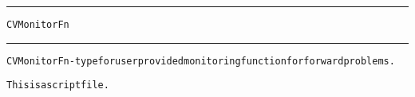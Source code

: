 \begin{samepage}
\hrule
\begin{center}
{\large \verb!CVMonitorFn!}
\label{p:CVMonitorFn}
\end{center}
\hrule\vspace{0.1in}



\begin{alltt}
CVMonitorFn - type for user provided monitoring function for forward problems.
\end{alltt}

\end{samepage}



\begin{samepage}


\begin{alltt}
This is a script file. 
\end{alltt}

\end{samepage}



